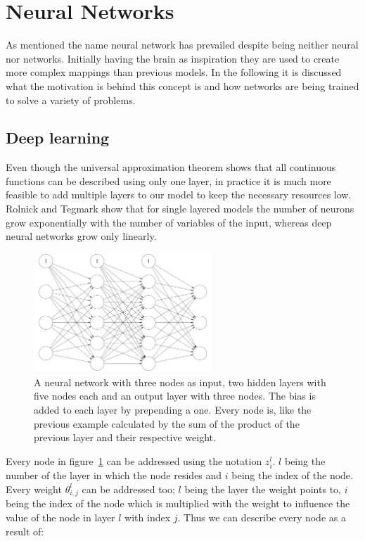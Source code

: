 \section{Neural Networks}
\label{ch:neural_networks}

As mentioned the name neural network has prevailed despite being neither neural nor networks.
Initially having the brain as inspiration they are used to create more complex mappings than previous models.
In the following it is discussed what the motivation is behind this concept is and how networks are being trained to solve a variety of problems.

\subsection{Deep learning}
\label{ch:deep_learning}

Even though the universal approximation theorem shows that all continuous functions can be described using only one layer, in practice it is much more feasible to add multiple layers to our model to keep the necessary resources low.
Rolnick and Tegmark\cite{Rolnick2017} show that for single layered models the number of neurons grow exponentially with the number of variables of the input, whereas deep neural networks grow only linearly.

\begin{figure} \label{fig:nn}
    \centering
    \caption{ A neural network with three nodes as input, two hidden layers with five nodes each and an output layer with three nodes. The bias is added to each layer by prepending a one. Every node is, like the previous example calculated by the sum of the product of the previous layer and their respective weight. }
    \includegraphics[width=0.6\textwidth]{images/2_nn_with_bias.png}
\end{figure}

Every node in figure~\ref{fig:nn} can be addressed using the notation $z^l_i$. $l$ being the number of the layer in which the node resides and $i$ being the index of the node.
Every weight $\theta^l_{i, j}$ can be addressed too; $l$ being the layer the weight points to, $i$ being the index of the node which is multiplied with the weight to influence the value of the node in layer $l$ with index $j$.
Thus we can describe every node as a result of:

